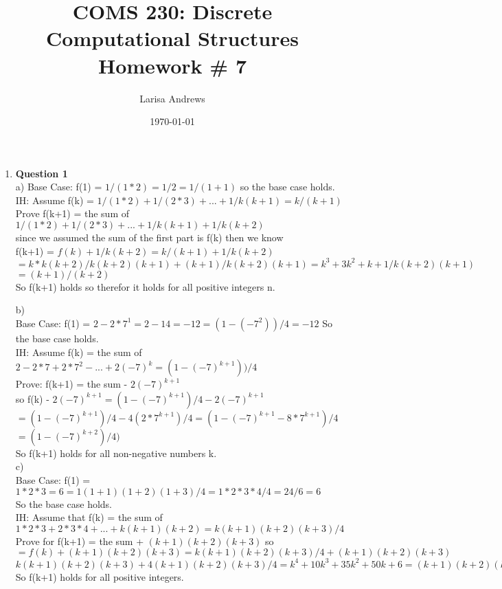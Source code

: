 \documentclass[12pt]{article}
\begin{document}

\title{
\textbf{COMS 230: Discrete Computational Structures}\\
Homework \# 7 \\}
\author{Larisa Andrews}
\date{\today}
\maketitle

\begin{enumerate}

\item {\bf Question 1} \\
a) 
	Base Case: f(1) = $1/(1*2) = 1/2 = 1/(1+1)$ so the base case holds. \\
	IH: Assume f(k) = $1/(1*2) + 1/(2*3) + ... + 1/k(k+1) = k/(k+1)$ \\
	Prove f(k+1) = the sum of $1/(1*2) + 1/(2*3) + ... + 1/k(k+1) + 1/k(k+2)$\\
	 since we assumed the sum of the first part is f(k) then we know \\
	 f(k+1) = $f(k) + 1/k(k+2) = k/(k+1) + 1/k(k+2)$ \\
	 $ = k*k(k+2)/k(k+2)(k+1) + (k+1)/k(k+2)(k+1)  = k^3+3k^2+k+1/k(k+2)(k+1)$ \\
	 $ =  (k+1)/(k+2) $ \\
	 So f(k+1) holds so therefor it holds for all positive integers n. 
	
	
	

b) \\
   Base Case: f(1) = $2-2*7^1 = 2-14 = -12 = (1-(-7^2))/4 = -12$ So the base case holds. \\
   IH: Assume f(k) = the sum of $2-2*7 + 2*7^2 - ... + 2(-7)^k = (1-(-7)^{k+1}))/4$ \\
   Prove: f(k+1) = the sum - $2(-7)^{k+1}$ \\
   so f(k) - $2(-7)^{k+1} = (1-(-7)^{k+1})/4 - 2(-7)^{k+1}$ \\
   $ = (1-(-7)^{k+1})/4 - 4(2*7^{k+1})/4 = (1-(-7)^{k+1} - 8*7^{k+1})/4$ \\ $ = (1-(-7)^{k+2})/4) $ \\
   So f(k+1) holds for all non-negative numbers k. \\
   
   
c) \\
	Base Case: f(1) = $1*2*3 = 6 = 1(1+1)(1+2)(1+3)/4 = 1*2*3*4/4 = 24/6 = 6 $ \\
	So the base case holds.\\
	IH: Assume that f(k) = the sum of $1*2*3 + 2*3*4 + ... + k(k+1)(k+2) = k(k+1)(k+2)(k+3)/4$ \\
	Prove for f(k+1) = the sum + $(k+1)(k+2)(k+3)$ so \\
	$ = f(k) + (k+1)(k+2)(k+3) = k(k+1)(k+2)(k+3)/4 + (k+1)(k+2)(k+3) $ \\
	$ k(k+1)(k+2)(k+3) + 4(k+1)(k+2)(k+3) / 4 = k^4 + 10k^3 + 35k^2 + 50k + 6 = (k+1)(k+2)(k+3)(k+4)/4 $\\
	So f(k+1) holds for all positive integers. \\
	

\end{enumerate}
\end{document}
